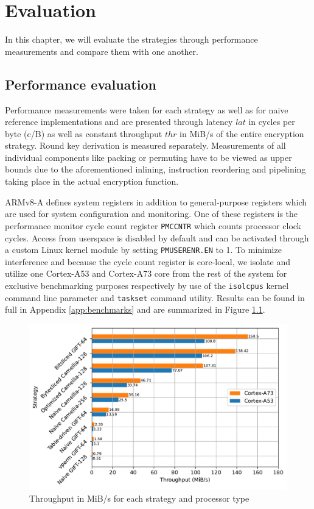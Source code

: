 \chapter{Evaluation}

In this chapter, we will evaluate the strategies through performance
measurements and compare them with one another.

\section{Performance evaluation}

Performance measurements were taken for each strategy as well as for naive
reference implementations and are presented through latency $lat$ in cycles per
byte (c/B) as well as constant throughput $thr$ in MiB/s of the entire
encryption strategy. Round key derivation is measured separately. Measurements
of all individual components like packing or permuting have to be viewed as
upper bounds due to the aforementioned inlining, instruction reordering and
pipelining taking place in the actual encryption function.

ARMv8-A defines system registers in addition to general-purpose registers which
are used for system configuration and monitoring. One of these registers is the
performance monitor cycle count register \texttt{PMCCNTR} which counts
processor clock cycles. Access from userspace is disabled by default and can be
activated through a custom Linux kernel module by setting \texttt{PMUSERENR.EN}
to 1. To minimize interference and because the cycle count register is
core-local, we isolate and utilize one Cortex-A53 and Cortex-A73 core from the
rest of the system for exclusive benchmarking purposes respectively by use of
the \texttt{isolcpus} kernel command line parameter and \texttt{taskset}
command utility. Results can be found in full in Appendix \ref{app:benchmarks}
and are summarized in Figure \ref{figure:benchmark}.

\begin{figure}[h!]
    \centering
    \includegraphics[width=\textwidth]{Figures/benchmark_plot.pdf}
    \caption{Throughput in MiB/s for each strategy and processor type}
    \label{figure:benchmark}
\end{figure}

